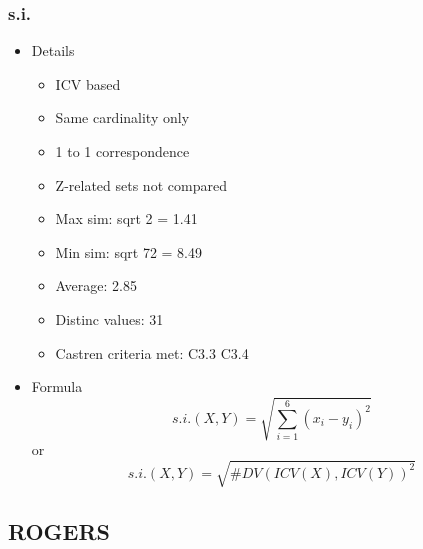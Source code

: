 \documentclass{article}
\begin{document}
\subsubsection{s.i.}
\label{sec-6-3-1}
\begin{itemize}

\item Details
\label{sec-6-3-1-1}%
\begin{itemize}
\item ICV based
\item Same cardinality only
\item 1 to 1 correspondence
\item Z-related sets not compared
\item Max sim: sqrt 2 = 1.41
\item Min sim: sqrt 72 = 8.49
\item Average: 2.85
\item Distinc values: 31
\item Castren criteria met: C3.3 C3.4
\end{itemize}

\item Formula\\
\label{sec-6-3-1-2}%
$$ 
s.i.(X,Y)=\sqrt{\sum_{i=1}^{6}(x_{i}-y_{i})^{2}} 
$$
or
$$ s.i.(X,Y)=\sqrt{ \#DV( ICV(X), ICV(Y) )^{2}  }  $$
\end{itemize} %
\subsection{ROGERS}
\label{sec-6-4}
\end{document}
